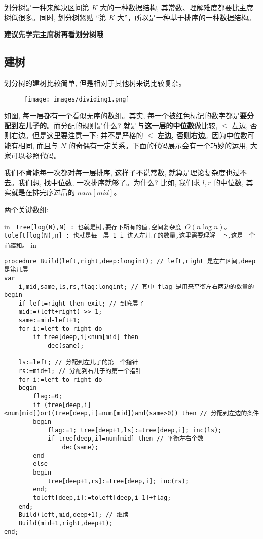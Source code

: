 
划分树是一种来解决区间第 $K$ 大的一种数据结构, 其常数、理解难度都要比主席树低很多。同时, 划分树紧贴 “第 $K$ 大”，所以是一种基于排序的一种数据结构。

\textbf{建议先学完主席树再看划分树哦}

\subsection{建树}

划分树的建树比较简单, 但是相对于其他树来说比较复杂。

\begin{figure}[h]
\centering
\texttt{[image: images/dividing1.png]} 

\end{figure}

如图, 每一层都有一个看似无序的数组。其实, 每一个被红色标记的数字都是\textbf{要分配到左儿子的}。而分配的规则是什么? 就是与\textbf{这一层的中位数}做比较, $\leq$ 左边, 否则右边。但是这里要注意一下: 并不是严格的 $\leq$ \textbf{左边, 否则右边}。因为中位数可能有相同, 而且与 $N$ 的奇偶有一定关系。下面的代码展示会有一个巧妙的运用, 大家可以参照代码。

我们不肯能每一次都对每一层排序, 这样子不说常数, 就算是理论复杂度也过不去。我们想, 找中位数, 一次排序就够了。为什么? 比如, 我们求 $l,r$ 的中位数, 其实就是在排完序过后的 $num[mid]$。

两个关键数组:

 in
\texttt{
tree[log(N),N]   : 也就是树,要存下所有的值,空间复杂度 $O(n\log n)$。\\toleft[log(N),n] : 也就是每一层 1~i 进入左儿子的数量,这里需要理解一下,这是一个前缀和。}
 in

\begin{verbatim}
procedure Build(left,right,deep:longint); // left,right 是左右区间,deep是第几层
var
	i,mid,same,ls,rs,flag:longint; // 其中 flag 是用来平衡左右两边的数量的
begin
	if left=right then exit; // 到底层了
	mid:=(left+right) >> 1;
	same:=mid-left+1;
	for i:=left to right do 
		if tree[deep,i]<num[mid] then
			dec(same);

	ls:=left; // 分配到左儿子的第一个指针
	rs:=mid+1; // 分配到右儿子的第一个指针
	for i:=left to right do
	begin
		flag:=0;
		if (tree[deep,i]<num[mid])or((tree[deep,i]=num[mid])and(same>0)) then // 分配到左边的条件
		begin
			flag:=1; tree[deep+1,ls]:=tree[deep,i]; inc(ls);
			if tree[deep,i]=num[mid] then // 平衡左右个数
				dec(same);
		end
		else
		begin
			tree[deep+1,rs]:=tree[deep,i]; inc(rs);
		end;
		toleft[deep,i]:=toleft[deep,i-1]+flag;
	end;
	Build(left,mid,deep+1); // 继续
	Build(mid+1,right,deep+1);
end;
\end{verbatim}

